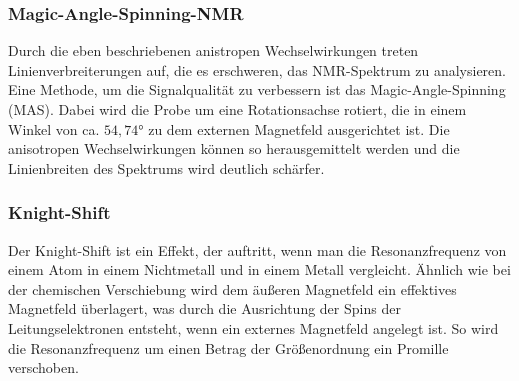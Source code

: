 \subsubsection*{Magic-Angle-Spinning-NMR}
Durch die eben beschriebenen anistropen Wechselwirkungen treten Linienverbreiterungen auf, die es erschweren, das NMR-Spektrum zu analysieren. Eine Methode, um die Signalqualität zu verbessern ist das Magic-Angle-Spinning (MAS). Dabei wird die Probe um eine Rotationsachse rotiert, die in einem Winkel von ca. $54,74°$ zu dem externen Magnetfeld ausgerichtet ist. Die anisotropen Wechselwirkungen können so herausgemittelt werden und die Linienbreiten des Spektrums wird deutlich schärfer.
\subsubsection*{Knight-Shift}
Der Knight-Shift ist ein Effekt, der auftritt, wenn man die Resonanzfrequenz von einem Atom in einem Nichtmetall und in einem Metall vergleicht. Ähnlich wie bei der chemischen Verschiebung wird dem äußeren Magnetfeld ein effektives Magnetfeld überlagert, was durch die Ausrichtung der Spins der Leitungselektronen entsteht, wenn ein externes Magnetfeld angelegt ist. So wird die Resonanzfrequenz um einen Betrag der Größenordnung ein Promille verschoben.

